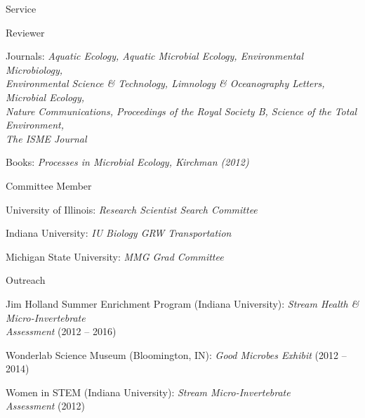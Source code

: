 \documentclass{resume} %
\begin{document}

\begin{rSection}{Service}

    \begin{rSubsection}{Reviewer}{}{}{}
        \item Journals: {\em Aquatic Ecology, Aquatic Microbial Ecology, Environmental Microbiology, \\ Environmental Science \& Technology, 
        Limnology \& Oceanography Letters, Microbial Ecology, \\ Nature Communications, Proceedings of the Royal Society B, Science of the Total Environment, \\
        The ISME Journal}
        \item Books: {\em Processes in Microbial Ecology, Kirchman (2012)}
    \end{rSubsection}

    \begin{rSubsection}{Committee Member}{}{}{}
        \item University of Illinois: {\em Research Scientist Search Committee}
        \item Indiana University: {\em IU Biology GRW Transportation}
        \item Michigan State University: {\em MMG Grad Committee}
    \end{rSubsection}

    \begin{rSubsection}{Outreach}{}{}{}
        \item Jim Holland Summer Enrichment Program (Indiana University):
        {\em Stream Health \& Micro-Invertebrate\\Assessment} (2012 -- 2016)
        \item Wonderlab Science Museum (Bloomington, IN): {\em Good Microbes
        Exhibit} (2012 -- 2014)
        \item Women in STEM (Indiana University): {\em Stream Micro-Invertebrate
        \\ Assessment} (2012)
    \end{rSubsection}


\end{rSection}
\end{document}
